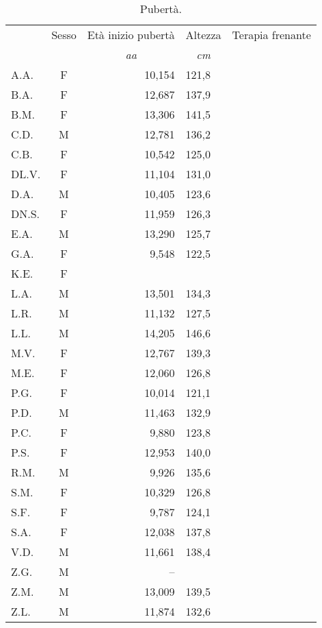 \begin{table}[!h]
\begin{center}
\begin{tabular}{lcrlc}
\toprule
 & Sesso 	& Età inizio pubertà	& Altezza	& Terapia frenante \\
 & &  \multicolumn{1}{c}{\emph{aa}} 	& \multicolumn{1}{c}{\emph{cm}}			\\
\midrule
A.A.	& F 	& 10,154 		& 121,8  		& \checkmark \\
B.A.	& F 	& 12,687 		& 137,9   		&            \\
B.M.	& F 	& 13,306 		& 141,5   		&            \\
C.D.	& M 	& 12,781 		& 136,2   		&            \\
C.B.	& F 	& 10,542 		& 125,0   		& \checkmark \\
DL.V.	& F 	& 11,104 		& 131,0   		&            \\
D.A.	& M 	& 10,405 		& 123,6   		& \checkmark \\
DN.S.	& F 	& 11,959 		& 126,3   		&            \\
E.A.	& M 	& 13,290 		& 125,7   		&            \\
G.A.	& F 	& 9,548  		& 122,5   		&            \\
K.E.	& F 	&        		&    		&            \\
L.A.	& M 	& 13,501 		& 134,3   		&            \\
L.R.	& M 	& 11,132 		& 127,5   		&            \\
L.L.	& M 	& 14,205 		& 146,6   		&            \\
M.V.	& F 	& 12,767 		& 139,3   		&            \\
M.E.	& F 	& 12,060 		& 126,8   		&            \\
P.G.	& F 	& 10,014 		& 121,1   		& \checkmark \\
P.D.	& M 	& 11,463 		& 132,9   		&            \\
P.C.	& F 	& 9,880  		& 123,8   		& \checkmark \\
P.S.	& F 	& 12,953 		& 140,0   		&            \\
R.M.	& M 	& 9,926  		& 135,6   		& \checkmark \\
S.M.	& F 	& 10,329 		& 126,8   		& \checkmark \\
S.F.	& F 	& 9,787  		& 124,1   		&            \\
S.A.	& F 	& 12,038 		& 137,8   		&            \\
V.D.	& M 	& 11,661 		& 138,4   		&            \\
Z.G.	& M 	&   --   		&    		&            \\
Z.M.	& M 	& 13,009 		& 139,5   		&            \\
Z.L.	& M 	& 11,874 		& 132,6   		&            \\
\bottomrule
\end{tabular}
\end{center}
\caption{Pubertà.}
\label{tab:Puberta}
\end{table}


